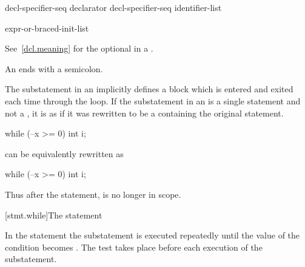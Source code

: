\begin{bnf}
\br
     decl-specifier-seq declarator\br
     decl-specifier-seq  \terminal{[} identifier-list \terminal{]}
\end{bnf}

\begin{bnf}
\br
    expr-or-braced-init-list
\end{bnf}

See~\ref{dcl.meaning} for the optional  in a
.
\begin{note}
An  ends with a semicolon.
\end{note}

\pnum
{}%
The substatement in an  implicitly defines
a block  which is entered and exited each time
through the loop.
If the substatement in an  is
a single statement and not a ,
it is as if it was rewritten to be
a  containing the original statement.
\begin{example}
\begin{codeblock}
while (--x >= 0)
  int i;
\end{codeblock}
can be equivalently rewritten as
\begin{codeblock}
while (--x >= 0) {
  int i;
}
\end{codeblock}
Thus after the  statement,  is no longer in scope.
\end{example}

[stmt.while]{The  statement}%

\pnum
In the  statement the substatement is executed repeatedly
until the value of the condition becomes
. The test takes place before each execution of the
substatement.

